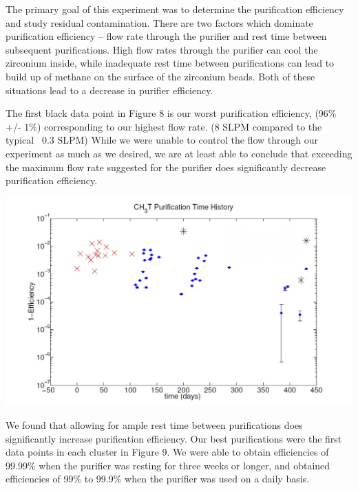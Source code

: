 \documentclass[a4paper,12pt]{article}
\begin{document}
The primary goal of this experiment was to determine the purification efficiency and study residual contamination.  There are two factors which dominate purification efficiency -- flow rate through the purifier and rest time between subsequent purifications.  High flow rates through the purifier can cool the zirconium inside, while inadequate rest time between purifications can lead to build up of methane on the surface of the zirconium beads.  Both of these situations lead to a decrease in purifier efficiency. 

The first black data point in Figure 8 is our worst purification efficiency, (96\% +/- 1\%) corresponding to our highest flow rate. (8 SLPM compared to the typical ~0.3 SLPM)  While we were unable to control the flow through our experiment as much as we desired, we are at least able to conclude that exceeding the maximum flow rate suggested for the purifier does significantly decrease purification efficiency.

\begin{center}
\includegraphics[scale=0.5]{Figone.jpg}
\end{center}

We found that allowing for ample rest time between purifications does significantly increase purification efficiency. Our best purifications were the first data points in each cluster in Figure 9.  We were able to obtain efficiencies of 99.99\% when the purifier was resting for three weeks or longer, and obtained efficiencies of 99\% to 99.9\% when the purifier was used on a daily basis.
\end{document}
